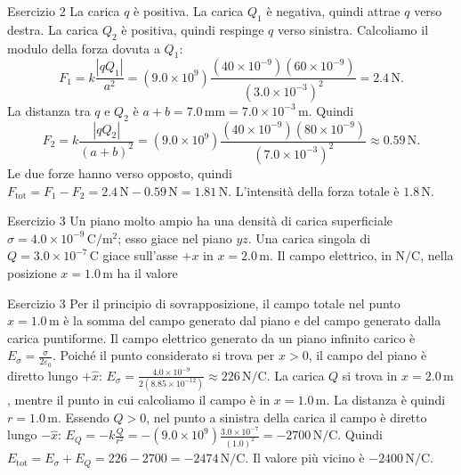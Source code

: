 \documentclass[a4paper]{article}
\begin{document}
\begin{snippetsolution}{Esercizio 2}
    La carica \(q\) è positiva. La carica \(Q_1\) è negativa, quindi attrae
    \(q\) verso destra. La carica \(Q_2\) è positiva, quindi respinge \(q\)
    verso sinistra.
    Calcoliamo il modulo della forza dovuta a \(Q_1\):
    \[
        F_1 =
        k \frac{|qQ_1|}{a^2}
        =
        \left(9.0 \times 10^9\right)
        \frac{
            \left(40 \times 10^{-9}\right)
            \left(60 \times 10^{-9}\right)
        }{
            \left(3.0 \times 10^{-3}\right)^2
        }
        =
        2.4\,\mathrm{N}.
    \]
    La distanza tra \(q\) e \(Q_2\) è
    \(a+b = 7.0\,\mathrm{mm} = 7.0 \times 10^{-3}\,\mathrm{m}.\)
    Quindi
    \[
        F_2 =
        k \frac{|qQ_2|}{(a+b)^2}
        =
        \left(9.0 \times 10^9\right)
        \frac{
            \left(40 \times 10^{-9}\right)
            \left(80 \times 10^{-9}\right)
        }{
            \left(7.0 \times 10^{-3}\right)^2
        }
        \approx
        0.59\,\mathrm{N}.
    \]
    Le due forze hanno verso opposto, quindi
    \(F_{\mathrm{tot}} = F_1 - F_2 = 2.4\,\mathrm{N} - 0.59\,\mathrm{N} = 1.81\,\mathrm{N}.\)
    L'intensità della forza totale è
    \(\boxed{1.8\,\mathrm{N}}.\)
\end{snippetsolution}
\begin{snippetexercise}{Esercizio 3}
    Un piano molto ampio ha una densità di carica superficiale
    \(\sigma = 4.0 \times 10^{-9}\,\mathrm{C/m^2}\); esso giace nel piano
    \(yz\). Una carica singola di
    \(Q = 3.0 \times 10^{-7}\,\mathrm{C}\) giace sull'asse \(+x\) in
    \(x = 2.0\,\mathrm{m}\). Il campo elettrico, in \(\mathrm{N/C}\), nella
    posizione \(x = 1.0\,\mathrm{m}\) ha il valore

\end{snippetexercise}
\begin{snippetsolution}{Esercizio 3}
    Per il principio di sovrapposizione, il campo totale nel punto
    \(x = 1.0\,\mathrm{m}\) è la somma del campo generato dal piano e del campo
    generato dalla carica puntiforme.
    Il campo elettrico generato da un piano infinito carico è
    \(E_{\sigma} = \frac{\sigma}{2\varepsilon_0}.\)
    Poiché il punto considerato si trova per \(x>0\), il campo del piano è
    diretto lungo \(+\hat{x}\):
    \(E_{\sigma} = \frac{4.0 \times 10^{-9}}{2(8.85 \times 10^{-12})} \approx 226\,\mathrm{N/C}.\)
    La carica \(Q\) si trova in \(x = 2.0\,\mathrm{m}\), mentre il punto in cui
    calcoliamo il campo è in \(x = 1.0\,\mathrm{m}\). La distanza è quindi
    \(r = 1.0\,\mathrm{m}.\)
    Essendo \(Q>0\), nel punto a sinistra della carica il campo è diretto lungo
    \(-\hat{x}\):
    \(E_Q = - k \frac{Q}{r^2} = -\left(9.0 \times 10^9\right) \frac{3.0 \times 10^{-7}}{(1.0)^2} = -2700\,\mathrm{N/C}.\)
    Quindi
    \(E_{\mathrm{tot}} = E_{\sigma} + E_Q = 226 - 2700 = -2474\,\mathrm{N/C}.\)
    Il valore più vicino è
    \(\boxed{-2400\,\mathrm{N/C}}.\)
\end{snippetsolution}
\end{document}

